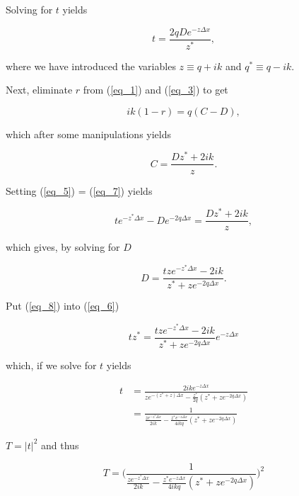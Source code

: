 \documentclass{article}
\begin{document}
Solving for $t$ yields

\begin{equation}
    t = \frac{2qDe^{-z\Delta x}}{z^*}, \label{eq_6}
\end{equation}

where we have introduced the variables $z \equiv q + ik$ and $q^* \equiv q - ik$.

Next, eliminate $r$ from (\ref{eq_1}) and (\ref{eq_3}) to get

\begin{equation}
ik(1 - r) = q(C - D),
\end{equation}

which after some manipulations yields

\begin{equation}
C = \frac{Dz^* + 2ik}{z} \label{eq_7}.
\end{equation}

Setting (\ref{eq_5}) = (\ref{eq_7}) yields

\begin{equation}
te^{-z^*\Delta x} - De^{-2q\Delta x} = \frac{Dz^* + 2ik}{z},
\end{equation}

which gives, by solving for $D$

\begin{equation}
D = \frac{tze^{-z^*\Delta x} - 2ik}{z^* + ze^{-2q\Delta x}} \label{eq_8}.
\end{equation}

Put (\ref{eq_8}) into (\ref{eq_6})

\begin{equation}
tz^* = \frac{tze^{-z^*\Delta x} - 2ik}{z^* + ze^{-2q\Delta x}}e^{-z\Delta x}
\end{equation}

which, if we solve for $t$ yields

\begin{align}
t &= \frac{2ike^{-z\Delta x}}{ze^{-(z^* + z)\Delta x} - \frac{z^*}{2q}(z^*+ze^{-2q\Delta x})} \\
  &= \frac{1}{\frac{ze^{-z^*\Delta x}}{2ik} - \frac{z^*e^{-z\Delta x}}{4ikq}(z^* + ze^{-2q\Delta x})}
\end{align}

$T = |t|^2$ and thus

\begin{equation}
T = \bigg( \frac{1}{\frac{ze^{-z^*\Delta x}}{2ik} - \frac{z^*e^{-z\Delta x}}{4ikq}(z^* + ze^{-2q\Delta x})} \bigg)^2
\end{equation}
\end{document}
